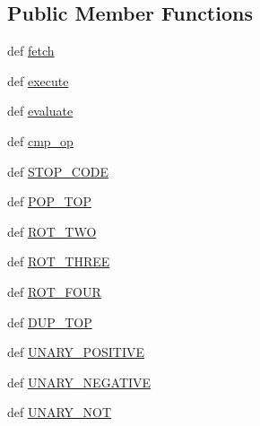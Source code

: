 \subsection*{Public Member Functions}
\begin{DoxyCompactItemize}
\item 
def \hyperlink{classscipy_1_1weave_1_1bytecodecompiler_1_1ByteCodeMeaning_a1950cc0da82ed1f40b7855b1746e0faf}{fetch}
\item 
def \hyperlink{classscipy_1_1weave_1_1bytecodecompiler_1_1ByteCodeMeaning_aae527a00f280520157ba48d96130206e}{execute}
\item 
def \hyperlink{classscipy_1_1weave_1_1bytecodecompiler_1_1ByteCodeMeaning_ab16fac63b1e7853d104ee3b7d236cdf8}{evaluate}
\item 
def \hyperlink{classscipy_1_1weave_1_1bytecodecompiler_1_1ByteCodeMeaning_afd8b8aef3f21fcd2189e9b149eb9e998}{cmp\+\_\+op}
\item 
def \hyperlink{classscipy_1_1weave_1_1bytecodecompiler_1_1ByteCodeMeaning_af9c959154ca8db4d43e7c62eec07d9a1}{S\+T\+O\+P\+\_\+\+C\+O\+D\+E}
\item 
def \hyperlink{classscipy_1_1weave_1_1bytecodecompiler_1_1ByteCodeMeaning_ad765e66ce2020df76276fdb0107b9e0c}{P\+O\+P\+\_\+\+T\+O\+P}
\item 
def \hyperlink{classscipy_1_1weave_1_1bytecodecompiler_1_1ByteCodeMeaning_af722449f7539f1d5dc85b5bec56c93f6}{R\+O\+T\+\_\+\+T\+W\+O}
\item 
def \hyperlink{classscipy_1_1weave_1_1bytecodecompiler_1_1ByteCodeMeaning_aee35fc773697fb9e1b504554dcfd4ec3}{R\+O\+T\+\_\+\+T\+H\+R\+E\+E}
\item 
def \hyperlink{classscipy_1_1weave_1_1bytecodecompiler_1_1ByteCodeMeaning_a5d57a3885d34bdd1ae441881ef372201}{R\+O\+T\+\_\+\+F\+O\+U\+R}
\item 
def \hyperlink{classscipy_1_1weave_1_1bytecodecompiler_1_1ByteCodeMeaning_a6fc008d292b8527f5aedb6c6b150b0fd}{D\+U\+P\+\_\+\+T\+O\+P}
\item 
def \hyperlink{classscipy_1_1weave_1_1bytecodecompiler_1_1ByteCodeMeaning_ac4acbadbb19563cb488014a6f5eaeeb8}{U\+N\+A\+R\+Y\+\_\+\+P\+O\+S\+I\+T\+I\+V\+E}
\item 
def \hyperlink{classscipy_1_1weave_1_1bytecodecompiler_1_1ByteCodeMeaning_a0b3fd672ec1b1bb9a6e6900543e3a1f8}{U\+N\+A\+R\+Y\+\_\+\+N\+E\+G\+A\+T\+I\+V\+E}
\item 
def \hyperlink{classscipy_1_1weave_1_1bytecodecompiler_1_1ByteCodeMeaning_a773ff384ea6ec58e8f95aa013dffec13}{U\+N\+A\+R\+Y\+\_\+\+N\+O\+T}

\end{DoxyCompactItemize}
